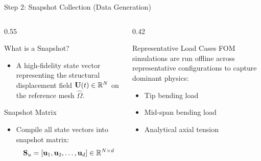 \begin{frame}{Step 2: Snapshot Collection (Data Generation)}
  \small
  \begin{columns}[T]
    \begin{column}{0.55\textwidth}
      \begin{block}{What is a Snapshot?}
        \begin{itemize}
          \item A high-fidelity state vector representing the structural displacement field $\mathbf{U}(t) \in \mathbb{R}^N$ on the reference mesh $\hat{\Omega}$.
        \end{itemize}
      \end{block}
      \begin{block}{Snapshot Matrix}
        \begin{itemize}
          \item Compile all state vectors into snapshot matrix:
          \[
            \mathbf{S}_u = [\mathbf{u}_1, \mathbf{u}_2, \dots, \mathbf{u}_d] \in \mathbb{R}^{N \times d}
          \]
        \end{itemize}
      \end{block}
    \end{column}
    \begin{column}{0.42\textwidth}
      \begin{exampleblock}{Representative Load Cases}
        FOM simulations are run offline across representative configurations to capture dominant physics:
        \begin{itemize}
          \item Tip bending load
          \item Mid-span bending load
          \item Analytical axial tension
        \end{itemize}
      \end{exampleblock}
    \end{column}
  \end{columns}
\end{frame}

